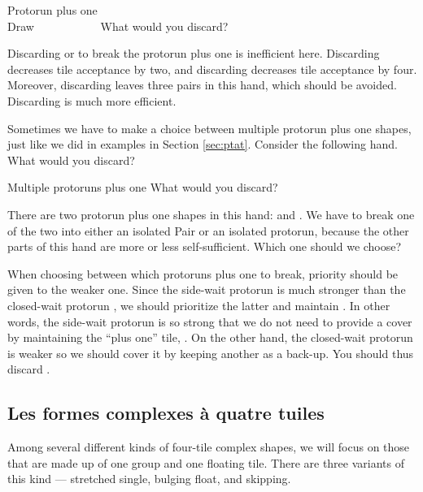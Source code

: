 \begin{itembox}[r]{Protorun plus one}
\bp
{}~\\
\hfill\footnotesize{Draw~~~~~~~~~~~}
\ep
\vspace{-15pt}What would you discard? \vspace{-5pt}
\end{itembox}
\noindent
Discarding {\LARGE{}} or {\LARGE{}} to break the protorun plus one {\LARGE{}} is inefficient here. Discarding {\LARGE{}} decreases tile acceptance by two, and discarding {\LARGE{}} decreases tile acceptance by four. Moreover, discarding {\LARGE{}} leaves three pairs in this hand, which should be avoided. Discarding {\LARGE{}} is much more efficient. 

\bigskip

Sometimes we have to make a choice between multiple protorun plus one shapes, just like we did in examples in Section \ref{sec:ptat}. 
Consider the following hand. What would you discard?
\begin{itembox}[r]{Multiple protoruns plus one}
\bp
{}\bei\bei
\ep
\vspace{-10pt}What would you discard? \vspace{-5pt}
\end{itembox}
\noindent
There are two protorun plus one shapes in this hand: {\LARGE{}} and {\LARGE{}}. We have to break one of the two into either an isolated Pair or an isolated protorun, because the other parts of this hand are more or less self-sufficient. Which one should we choose?

\bigskip
When choosing between which protoruns plus one to break, priority should be given to the weaker one. Since the side-wait protorun {\LARGE{}} is much stronger than the closed-wait protorun {\LARGE{}}, we should prioritize the latter and maintain {\LARGE{}}. In other words, the side-wait protorun {\LARGE{}} is so strong that we do not need to provide a cover by maintaining the ``plus one'' tile, {\LARGE{}}. On the other hand, the closed-wait protorun {\LARGE{}} is weaker so we should cover it by keeping another {\LARGE{}} as a back-up. You should thus discard {\LARGE{}}. 

\subsection{Les formes complexes à quatre tuiles} 
Among several different kinds of four-tile complex shapes, we will focus on those that are made up of one group and one floating tile. There are three variants of this kind --- stretched single, bulging float, and skipping.

